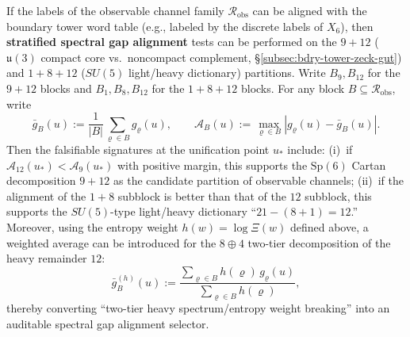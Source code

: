 \begin{remark}\label{rem:spec-gap-block-selector}
If the labels of the observable channel family \(\mathcal{R}_{\mathrm{obs}}\) can be aligned with the boundary tower word table (e.g., labeled by the discrete labels of \(X_6\)),
then \textbf{stratified spectral gap alignment} tests can be performed on the \(9+12\) (\(\mathfrak{u}(3)\) compact core vs.\ noncompact complement, \S\ref{subsec:bdry-tower-zeck-gut})
and \(1+8+12\) (\(SU(5)\) light/heavy dictionary) partitions.
Write \(B_9,B_{12}\) for the \(9+12\) blocks and \(B_1,B_8,B_{12}\) for the \(1+8+12\) blocks.
For any block \(B\subseteq \mathcal{R}_{\mathrm{obs}}\), write
\[
\bar g_B(u):=\frac{1}{|B|}\sum_{\varrho\in B} g_{\varrho}(u),\qquad
\mathcal{A}_B(u):=\max_{\varrho\in B}\left|g_{\varrho}(u)-\bar g_B(u)\right|.
\]
Then the falsifiable signatures at the unification point \(u_\ast\) include:
(i)~if \(\mathcal{A}_{12}(u_\ast) < \mathcal{A}_{9}(u_\ast)\) with positive margin, this supports the \(\mathrm{Sp}(6)\) Cartan decomposition \(9+12\) as the candidate partition of observable channels;
(ii)~if the alignment of the \(1+8\) subblock is better than that of the \(12\) subblock, this supports the \(SU(5)\)-type light/heavy dictionary ``\(21-(8+1)=12\).''
Moreover, using the entropy weight \(h(w)=\log\Xi(w)\) defined above,
a weighted average can be introduced for the \(8\oplus 4\) two-tier decomposition of the heavy remainder \(12\):
\[
\bar g_B^{(h)}(u):=\frac{\sum_{\varrho\in B} h(\varrho)\,g_{\varrho}(u)}{\sum_{\varrho\in B} h(\varrho)},
\]
thereby converting ``two-tier heavy spectrum/entropy weight breaking'' into an auditable spectral gap alignment selector.
\end{remark}

